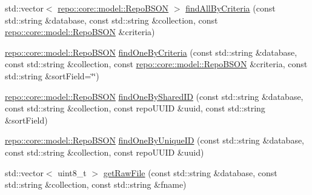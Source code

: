 \begin{DoxyCompactItemize}
\item 
std\+::vector$<$ \hyperlink{classrepo_1_1core_1_1model_1_1_repo_b_s_o_n}{repo\+::core\+::model\+::\+Repo\+B\+S\+O\+N} $>$ \hyperlink{classrepo_1_1core_1_1handler_1_1_mongo_database_handler_af8bc6c5531e6669b9ac278c6fc64ec3e}{find\+All\+By\+Criteria} (const std\+::string \&database, const std\+::string \&collection, const \hyperlink{classrepo_1_1core_1_1model_1_1_repo_b_s_o_n}{repo\+::core\+::model\+::\+Repo\+B\+S\+O\+N} \&criteria)
\item 
\hyperlink{classrepo_1_1core_1_1model_1_1_repo_b_s_o_n}{repo\+::core\+::model\+::\+Repo\+B\+S\+O\+N} \hyperlink{classrepo_1_1core_1_1handler_1_1_mongo_database_handler_a9e13fe73ff838e388378d82673964e20}{find\+One\+By\+Criteria} (const std\+::string \&database, const std\+::string \&collection, const \hyperlink{classrepo_1_1core_1_1model_1_1_repo_b_s_o_n}{repo\+::core\+::model\+::\+Repo\+B\+S\+O\+N} \&criteria, const std\+::string \&sort\+Field=\char`\"{}\char`\"{})
\item 
\hyperlink{classrepo_1_1core_1_1model_1_1_repo_b_s_o_n}{repo\+::core\+::model\+::\+Repo\+B\+S\+O\+N} \hyperlink{classrepo_1_1core_1_1handler_1_1_mongo_database_handler_aae7c0539fcdbad26c307c9f63877d536}{find\+One\+By\+Shared\+I\+D} (const std\+::string \&database, const std\+::string \&collection, const repo\+U\+U\+I\+D \&uuid, const std\+::string \&sort\+Field)
\item 
\hyperlink{classrepo_1_1core_1_1model_1_1_repo_b_s_o_n}{repo\+::core\+::model\+::\+Repo\+B\+S\+O\+N} \hyperlink{classrepo_1_1core_1_1handler_1_1_mongo_database_handler_ac016547468fc0049c859d775e270e17a}{find\+One\+By\+Unique\+I\+D} (const std\+::string \&database, const std\+::string \&collection, const repo\+U\+U\+I\+D \&uuid)
\item 
std\+::vector$<$ uint8\+\_\+t $>$ \hyperlink{classrepo_1_1core_1_1handler_1_1_mongo_database_handler_abcdf4cc7cbc0bbee8b9236349bde8364}{get\+Raw\+File} (const std\+::string \&database, const std\+::string \&collection, const std\+::string \&fname)
\end{DoxyCompactItemize}
